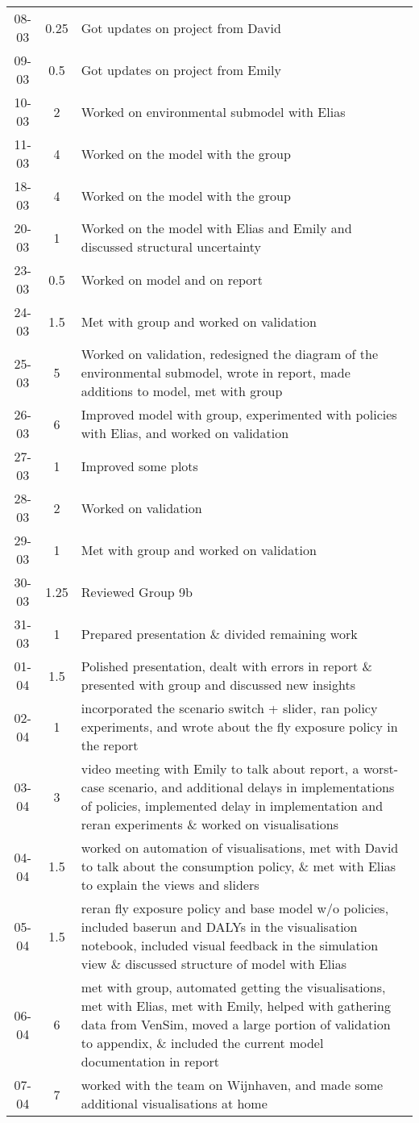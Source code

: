 \begin{longtable}[c]{c|c|m{35em}}
08-03 & 0.25 & Got updates on project from David \\
09-03 & 0.5 & Got updates on project from Emily \\
10-03 & 2 & Worked on environmental submodel with Elias \\
11-03 & 4 & Worked on the model with the group \\
18-03 & 4  & Worked on the model with the group \\
20-03 & 1 & Worked on the model with Elias and Emily and discussed structural uncertainty \\
23-03 & 0.5 & Worked on model and on report \\
24-03 & 1.5 & Met with group and worked on validation \\
25-03 & 5 & Worked on validation, redesigned the diagram of the environmental submodel, wrote in report, made additions to model, met with group \\
26-03 & 6 & Improved model with group, experimented with policies with Elias, and worked on validation \\
27-03 & 1 & Improved some plots \\
28-03 & 2 & Worked on validation \\
29-03 & 1 & Met with group and worked on validation \\
30-03 & 1.25 & Reviewed Group 9b \\
31-03 & 1 & Prepared presentation \& divided remaining work \\
01-04 & 1.5 & Polished presentation, dealt with errors in report \& presented with group and discussed new insights \\
02-04  & 1 & incorporated the scenario switch + slider, ran policy experiments, and wrote about the fly exposure policy in the report \\
03-04 & 3 & video meeting with Emily to talk about report, a worst-case scenario, and additional delays in implementations of policies, implemented delay in implementation and reran experiments \& worked on visualisations \\
04-04 & 1.5 & worked on automation of visualisations, met with David to talk about the consumption policy, \&  met with Elias to explain the views and sliders \\
05-04 & 1.5 & reran fly exposure policy and base model w/o policies, included baserun and DALYs in the visualisation notebook, included visual feedback in the simulation view \& discussed structure of model with Elias \\
06-04 & 6 & met with group, automated getting the visualisations, met with Elias, met with Emily, helped with gathering data from VenSim, moved a large portion of validation to appendix, \& included the current model documentation in report \\
07-04 & 7 & worked with the team on Wijnhaven, and made some additional visualisations at home 
\end{longtable}

